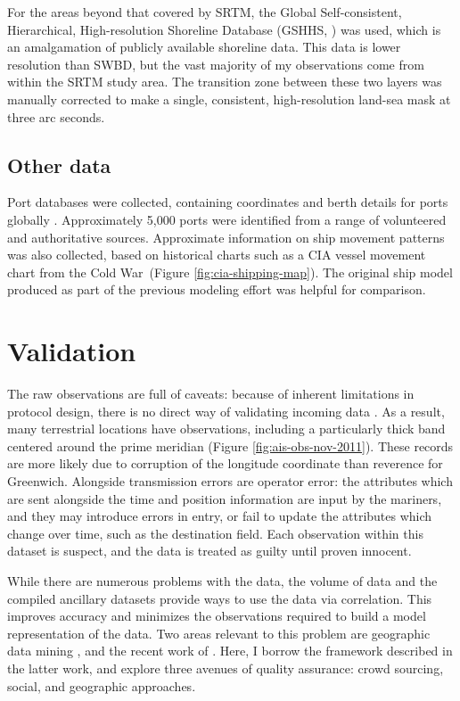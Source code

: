 For the areas beyond that covered by SRTM, the Global Self-consistent, Hierarchical, High-resolution Shoreline Database (GSHHS, \citealp{wessel1996global}) was used, which is an amalgamation of publicly available shoreline data. This data is lower resolution than SWBD, but the vast majority of my observations come from within the SRTM study area. The transition zone between these two layers was manually corrected to make a single, consistent, high-resolution land-sea mask at three arc seconds.

\subsection{Other data}
Port databases were collected, containing coordinates and berth details for ports globally \citep{Halpern2008,worldportindex}. Approximately 5,000 ports were identified %
from a range of volunteered and authoritative sources.  Approximate information on ship movement patterns was also collected, based on historical charts such as a CIA vessel movement chart from the Cold War~(Figure \ref{fig:cia-shipping-map}). The original ship model produced as part of the previous modeling effort \citep{Halpern2008} was helpful for comparison.

\section{Validation}

The raw observations are full of caveats: because of inherent limitations in protocol design, there is no direct way of validating incoming data \citep{RaymondInPress}. %
 As a result, many terrestrial locations have observations, including a particularly thick band centered around the prime meridian (Figure \ref{fig:ais-obs-nov-2011}). These records are more likely due to corruption of the longitude coordinate than reverence for Greenwich. Alongside transmission errors are operator error: the attributes which are sent alongside the time and position information are input by the mariners, and they may introduce errors in entry, or fail to update the attributes which change over time, such as the destination field. Each observation within this dataset is suspect, and the data is treated as guilty until proven innocent.

While there are numerous problems with the data, the volume of data and the compiled ancillary datasets provide ways to use the data via correlation.  This improves accuracy and minimizes the observations required to build a model representation of the data. Two areas relevant to this problem are geographic data mining \citep{miller2009geographic}, and the recent work of \cite{goodchildli2012}. Here, I borrow the framework described in the latter work, and explore three avenues of quality assurance: crowd sourcing, social, and geographic approaches.

